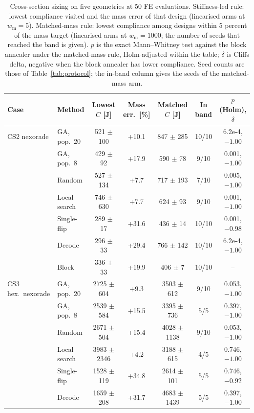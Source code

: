 \begin{table}[!htbp]
\centering
\footnotesize
\caption{Cross-section sizing on five geometries at 50 FE evaluations. Stiffness-led rule: lowest compliance visited and the mass error of that design (linearised arms at $w_{\text{m}}=5$). Matched-mass rule: lowest compliance among designs within 5 percent of the mass target (linearised arms at $w_{\text{m}}=1000$; the number of seeds that reached the band is given). $p$ is the exact Mann--Whitney test against the block annealer under the matched-mass rule, Holm-adjusted within the table; $\delta$ is Cliff\textquotesingle s delta, negative when the block annealer has lower compliance. Seed counts are those of Table~\ref{tab:protocol}; the in-band column gives the seeds of the matched-mass arm.}
\label{tab:sizing}
\scriptsize
\setlength{\tabcolsep}{3pt}
\begin{tabular}{llccccc}
\toprule
Case & Method & Lowest $C$ [J] & Mass err.\ [\%] & Matched $C$ [J] & In band & $p$ (Holm), $\delta$ \\
\midrule
CS2 nexorade & GA, pop.\ 20 & 521 $\pm$ 100 & +10.1 & 847 $\pm$ 285 & 10/10 & 6.2e-4, $-1.00$ \\
 & GA, pop.\ 8 & 429 $\pm$ 92 & +17.9 & 590 $\pm$ 78 & 9/10 & 0.001, $-1.00$ \\
 & Random & 527 $\pm$ 134 & +7.7 & 717 $\pm$ 193 & 7/10 & 0.005, $-1.00$ \\
 & Local search & 746 $\pm$ 630 & +7.7 & 624 $\pm$ 93 & 9/10 & 0.001, $-1.00$ \\
 & Single-flip & 289 $\pm$ 17 & +31.6 & 436 $\pm$ 14 & 10/10 & 0.001, $-0.98$ \\
 & Decode & 296 $\pm$ 33 & +29.4 & 766 $\pm$ 142 & 10/10 & 6.2e-4, $-1.00$ \\
 & Block & 336 $\pm$ 33 & +19.9 & 406 $\pm$ 7 & 10/10 & -- \\
\midrule
CS3 hex.\ nexorade & GA, pop.\ 20 & 2725 $\pm$ 604 & +9.3 & 3503 $\pm$ 612 & 9/10 & 0.053, $-1.00$ \\
 & GA, pop.\ 8 & 2539 $\pm$ 584 & +15.5 & 3395 $\pm$ 736 & 5/5 & 0.397, $-1.00$ \\
 & Random & 2671 $\pm$ 504 & +15.4 & 4028 $\pm$ 1138 & 9/10 & 0.053, $-1.00$ \\
 & Local search & 3983 $\pm$ 2346 & +4.2 & 3188 $\pm$ 615 & 4/5 & 0.746, $-1.00$ \\
 & Single-flip & 1528 $\pm$ 119 & +34.8 & 2614 $\pm$ 101 & 5/5 & 0.746, $-0.92$ \\
 & Decode & 1659 $\pm$ 208 & +31.7 & 4683 $\pm$ 1439 & 5/5 & 0.397, $-1.00$ \\

\end{tabular}
\end{table}
